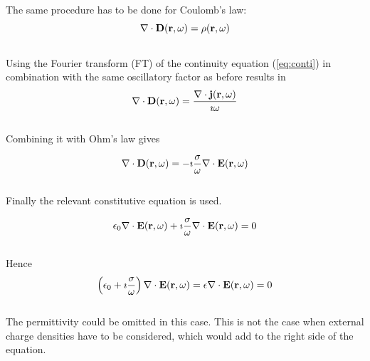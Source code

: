 \documentclass[a4paper,11pt]{thesis}
\begin{document}
The same procedure has to be done for Coulomb's law:\\

\begin{equation}
\nabla \cdot \mathbf{D}(\mathbf{r},\omega)=\rho(\mathbf{r},\omega) \\
\end{equation}\\

Using the Fourier transform (FT) of the continuity equation (\ref{eq:conti}) in combination with the same oscillatory factor as before results in\\

\begin{equation}
\nabla \cdot \mathbf{D}(\mathbf{r},\omega)= \frac{\nabla \cdot \mathbf{j}(\mathbf{r},\omega)}{\imath \omega} \\
\end{equation}\\

Combining it with Ohm's law gives

\begin{equation}
\nabla \cdot \mathbf{D}(\mathbf{r},\omega)= -\imath \frac{\sigma}{\omega}\nabla \cdot \mathbf{E}(\mathbf{r},\omega) \\
\end{equation}\\

Finally the relevant constitutive equation is used.

\begin{equation}
\epsilon_0 \nabla \cdot \mathbf{E}(\mathbf{r},\omega)+ \imath \frac{\sigma}{\omega}\nabla \cdot \mathbf{E}(\mathbf{r},\omega) =0\\
\end{equation}\\

Hence\\

\begin{equation}\label{epsilon_conducting_media_definition}
\left( \epsilon_0 + \imath \frac{\sigma}{\omega}\right) \nabla \cdot \mathbf{E}(\mathbf{r},\omega) =\epsilon \nabla \cdot \mathbf{E}(\mathbf{r},\omega)=0\\
\end{equation}\\

The permittivity could be omitted in this case. This is not the case when external charge densities have to be considered, which would add to the right side of the equation.
\end{document}
